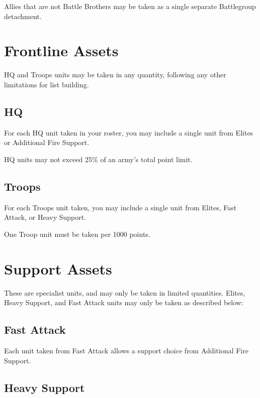 \documentclass[letterpaper,twocolumn,oneside,titlepage]{book}
\begin{document}
Allies that are not Battle Brothers may be taken as a single separate
Battlegroup detachment.

\section{\texorpdfstring{\textbf{Frontline
Assets}}{Frontline Assets}}\label{frontline-assets}

HQ and Troops units may be taken in any quantity, following any other
limitations for list building.

\subsection{\texorpdfstring{\textbf{HQ}}{HQ}}\label{hq}

For each HQ unit taken in your roster, you may include a single unit
from Elites or Additional Fire Support.

HQ units may not exceed 25\% of an army's total point limit.

\subsection{\texorpdfstring{\textbf{Troops}}{Troops}}\label{troops}

For each Troops unit taken, you may include a single unit from Elites,
Fast Attack, or Heavy Support.

One Troop unit must be taken per 1000 points.

\section{\texorpdfstring{\textbf{Support
Assets}}{Support Assets}}\label{support-assets}

These are specialist units, and may only be taken in limited quantities.
Elites, Heavy Support, and Fast Attack units may only be taken as
described below:

\subsection{\texorpdfstring{\textbf{Fast
Attack}}{Fast Attack}}\label{fast-attack}

Each unit taken from Fast Attack allows a support choice from Additional
Fire Support.

\subsection{\texorpdfstring{\textbf{Heavy
Support}}{Heavy Support}}\label{heavy-support}
\end{document}
